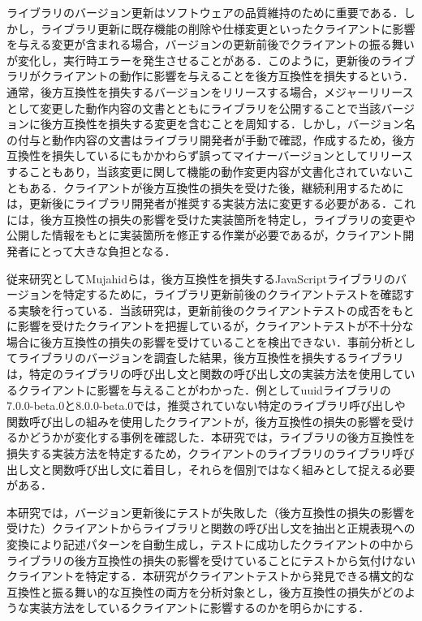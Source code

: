 \documentclass[11pt]{jreport}
\begin{document}
ライブラリのバージョン更新はソフトウェアの品質維持のために重要である．しかし，ライブラリ更新に既存機能の削除や仕様変更といったクライアントに影響を与える変更が含まれる場合，バージョンの更新前後でクライアントの振る舞いが変化し，実行時エラーを発生させることがある．このように，更新後のライブラリがクライアントの動作に影響を与えることを後方互換性を損失するという．通常，後方互換性を損失するバージョンをリリースする場合，メジャーリリースとして変更した動作内容の文書とともにライブラリを公開することで当該バージョンに後方互換性を損失する変更を含むことを周知する．しかし，バージョン名の付与と動作内容の文書はライブラリ開発者が手動で確認，作成するため，後方互換性を損失しているにもかかわらず誤ってマイナーバージョンとしてリリースすることもあり，当該変更に関して機能の動作変更内容が文書化されていないこともある\cite{UnderstandingWild}\cite{mostafa2017experience}．クライアントが後方互換性の損失を受けた後，継続利用するためには，更新後にライブラリ開発者が推奨する実装方法に変更する必要がある．これには，後方互換性の損失の影響を受けた実装箇所を特定し，ライブラリの変更や公開した情報をもとに実装箇所を修正する作業が必要であるが，クライアント開発者にとって大きな負担となる\cite{Nielsen2021JSFix}\cite{10.1145/3428255}．

従来研究としてMujahidらは，後方互換性を損失するJavaScriptライブラリのバージョンを特定するために，ライブラリ更新前後のクライアントテストを確認する実験を行っている\cite{mujahid}．当該研究は，更新前後のクライアントテストの成否をもとに影響を受けたクライアントを把握しているが，クライアントテストが不十分な場合に後方互換性の損失の影響を受けていることを検出できない．事前分析としてライブラリのバージョンを調査した結果，後方互換性を損失するライブラリは，特定のライブラリの呼び出し文と関数の呼び出し文の実装方法を使用しているクライアントに影響を与えることがわかった．例としてuuidライブラリの7.0.0-beta.0と8.0.0-beta.0では，推奨されていない特定のライブラリ呼び出しや関数呼び出しの組みを使用したクライアントが，後方互換性の損失の影響を受けるかどうかが変化する事例を確認した．本研究では，ライブラリの後方互換性を損失する実装方法を特定するため，クライアントのライブラリのライブラリ呼び出し文と関数呼び出し文に着目し，それらを個別ではなく組みとして捉える必要がある．

本研究では，バージョン更新後にテストが失敗した（後方互換性の損失の影響を受けた）クライアントからライブラリと関数の呼び出し文を抽出と正規表現への変換により記述パターンを自動生成し，テストに成功したクライアントの中からライブラリの後方互換性の損失の影響を受けていることにテストから気付けないクライアントを特定する．本研究がクライアントテストから発見できる構文的な互換性と振る舞い的な互換性の両方を分析対象とし，後方互換性の損失がどのような実装方法をしているクライアントに影響するのかを明らかにする．
\end{document}
